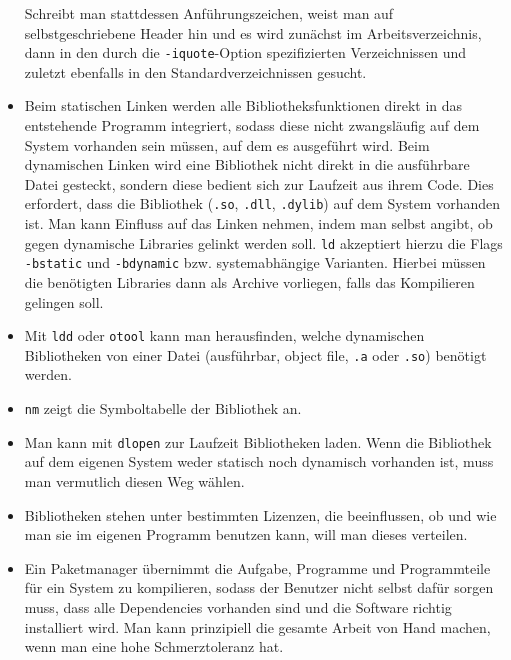 \documentclass{article}
\begin{document}
\begin{itemize}
         Schreibt man stattdessen Anführungszeichen, weist man auf
         selbstgeschriebene Header hin und es wird zunächst im
         Arbeitsverzeichnis, dann in den durch die \texttt{-iquote}-Option
         spezifizierten Verzeichnissen und zuletzt ebenfalls in den
         Standardverzeichnissen gesucht.
      \item Beim statischen Linken werden alle Bibliotheksfunktionen direkt in
         das entstehende Programm integriert, sodass diese nicht zwangsläufig
         auf dem System vorhanden sein müssen, auf dem es ausgeführt wird. Beim
         dynamischen Linken wird eine Bibliothek nicht direkt in die ausführbare
         Datei gesteckt, sondern diese bedient sich zur Laufzeit aus ihrem Code.
         Dies erfordert, dass die Bibliothek (\texttt{.so}, \texttt{.dll},
         \texttt{.dylib}) auf dem System vorhanden ist. Man kann Einfluss auf
         das Linken nehmen, indem man selbst angibt, ob gegen dynamische
         Libraries gelinkt werden soll. \texttt{ld} akzeptiert hierzu die
         Flags \texttt{-bstatic} und \texttt{-bdynamic} bzw. systemabhängige
         Varianten. Hierbei müssen die benötigten Libraries dann als Archive
         vorliegen, falls das Kompilieren gelingen soll.
      \item Mit \texttt{ldd} oder \texttt{otool} kann man herausfinden, welche
         dynamischen Bibliotheken von einer Datei (ausführbar, object file, \texttt{.a} oder
         \texttt{.so}) benötigt werden.
      \item \texttt{nm} zeigt die Symboltabelle der Bibliothek an.
      \item Man kann mit \texttt{dlopen} zur Laufzeit Bibliotheken laden. Wenn
         die Bibliothek auf dem eigenen System weder statisch noch dynamisch
         vorhanden ist, muss man vermutlich diesen Weg wählen.
      \item Bibliotheken stehen unter bestimmten Lizenzen, die beeinflussen, ob
         und wie man sie im eigenen Programm benutzen kann, will man dieses
         verteilen.
      \item Ein Paketmanager übernimmt die Aufgabe, Programme und Programmteile
         für ein System zu kompilieren, sodass der Benutzer nicht selbst dafür
         sorgen muss, dass alle Dependencies vorhanden sind und die Software
         richtig installiert wird. Man kann prinzipiell die gesamte Arbeit von
         Hand machen, wenn man eine hohe Schmerztoleranz hat.
   \end{itemize}


   
\end{document}
